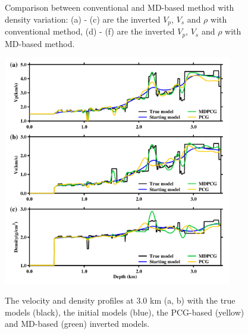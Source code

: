 \begin{figure}
\begin{center}
        \caption{Comparison between conventional and MD-based method with density
            variation: (a) - (c) are the inverted $V_p$, $V_s$ and $\rho$ with
            conventional method, (d) - (f) are the inverted $V_p$, $V_s$ and $\rho$
            with MD-based method. }
    \label{fig:InvertWithRho}
    \end{center}
\end{figure} 
\begin{figure}
    \begin{center}
        {\includegraphics[width=10cm]{Figure/chapter02/tariqsugresult/Fig/3kmrho.pdf}}
        \caption{
        The velocity and density profiles at 3.0 km (a, b)  with the true models
            (black),
            the initial models (blue), the PCG-based (yellow) and MD-based (green)
            inverted models.
    }
    \label{fig:RhoProfile3km}
    \end{center}
\end{figure}
